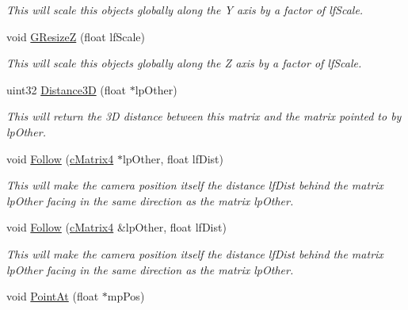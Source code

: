 \begin{DoxyCompactItemize}
\begin{DoxyCompactList}\small\item\em This will scale this objects globally along the Y axis by a factor of lfScale. \end{DoxyCompactList}\item 
\hypertarget{classc_camera_matrix4_a1ab7808cf06ddf7ec373b926c77f85c6}{
void \hyperlink{classc_camera_matrix4_a1ab7808cf06ddf7ec373b926c77f85c6}{GResizeZ} (float lfScale)}
\label{classc_camera_matrix4_a1ab7808cf06ddf7ec373b926c77f85c6}

\begin{DoxyCompactList}\small\item\em This will scale this objects globally along the Z axis by a factor of lfScale. \end{DoxyCompactList}\item 
\hypertarget{classc_camera_matrix4_adf5481b8c761008b9611e0b071e70914}{
uint32 \hyperlink{classc_camera_matrix4_adf5481b8c761008b9611e0b071e70914}{Distance3D} (float $\ast$lpOther)}
\label{classc_camera_matrix4_adf5481b8c761008b9611e0b071e70914}

\begin{DoxyCompactList}\small\item\em This will return the 3D distance between this matrix and the matrix pointed to by lpOther. \end{DoxyCompactList}\item 
\hypertarget{classc_camera_matrix4_aeee787e0f5895a613e8be9efbade408f}{
void \hyperlink{classc_camera_matrix4_aeee787e0f5895a613e8be9efbade408f}{Follow} (\hyperlink{classc_matrix4}{cMatrix4} $\ast$lpOther, float lfDist)}
\label{classc_camera_matrix4_aeee787e0f5895a613e8be9efbade408f}

\begin{DoxyCompactList}\small\item\em This will make the camera position itself the distance lfDist behind the matrix lpOther facing in the same direction as the matrix lpOther. \end{DoxyCompactList}\item 
\hypertarget{classc_camera_matrix4_a0bb6a232830c5e5571677b048cc1c45d}{
void \hyperlink{classc_camera_matrix4_a0bb6a232830c5e5571677b048cc1c45d}{Follow} (\hyperlink{classc_matrix4}{cMatrix4} \&lpOther, float lfDist)}
\label{classc_camera_matrix4_a0bb6a232830c5e5571677b048cc1c45d}

\begin{DoxyCompactList}\small\item\em This will make the camera position itself the distance lfDist behind the matrix lpOther facing in the same direction as the matrix lpOther. \end{DoxyCompactList}\item 
\hypertarget{classc_camera_matrix4_aa8ca47d59f6b3b454d700329bdbbdeea}{
void \hyperlink{classc_camera_matrix4_aa8ca47d59f6b3b454d700329bdbbdeea}{PointAt} (float $\ast$mpPos)}
\label{classc_camera_matrix4_aa8ca47d59f6b3b454d700329bdbbdeea}


\end{DoxyCompactItemize}

